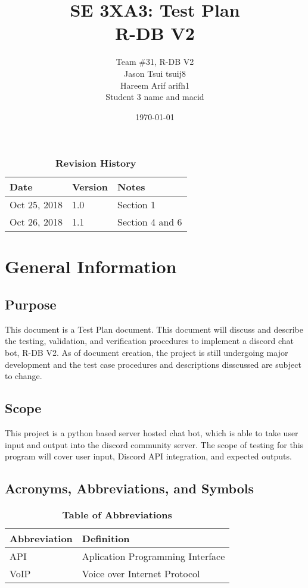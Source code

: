 \documentclass[12pt, titlepage]{article}
\title{SE 3XA3: Test Plan\\R-DB V2}
\author{Team \#31, R-DB V2
		\\ Jason Tsui tsuij8
		\\ Hareem Arif arifh1
		\\ Student 3 name and macid
}
\date{\today}
\begin{document}
\maketitle

\tableofcontents
\listoftables
\listoffigures

\begin{table}[bp]
\caption{\bf Revision History}
\begin{tabularx}{\textwidth}{p{3cm}p{2cm}X}
\toprule {\bf Date} & {\bf Version} & {\bf Notes}\\
\midrule
Oct 25, 2018 & 1.0 & Section 1\\
Oct 26, 2018 & 1.1 & Section 4 and 6\\
\bottomrule
\end{tabularx}
\end{table}

\newpage


\section{General Information}

\subsection{Purpose}
This document is a Test Plan document. This document will discuss and describe the testing, validation, and verification procedures to implement a discord chat bot, R-DB V2. As of document creation, the project is still undergoing major development and the test case procedures and descriptions disscussed are subject to change.

\subsection{Scope}
This project is a python based server hosted chat bot, which is able to take user input and output into the discord community server. The scope of testing for this program will cover user input, Discord API integration, and expected outputs. 

\subsection{Acronyms, Abbreviations, and Symbols}
	
\begin{table}[hbp]
\caption{\textbf{Table of Abbreviations}} \label{Table}

\begin{tabularx}{\textwidth}{p{3cm}X}
\toprule
\textbf{Abbreviation} & \textbf{Definition} \\
\midrule
API & Aplication Programming Interface\\
VoIP & Voice over Internet Protocol\\
\bottomrule
\end{tabularx}

\end{table}
\end{document}
